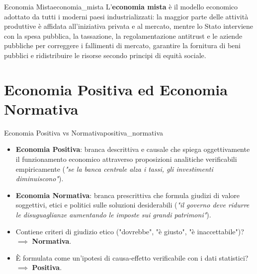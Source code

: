 \begin{definizione}{Economia Mista}{economia_mista}
L'\textbf{economia mista} è il modello economico adottato da tutti i moderni paesi industrializzati: la maggior parte delle attività produttive è affidata all'iniziativa privata e al mercato, mentre lo Stato interviene con la spesa pubblica, la tassazione, la regolamentazione antitrust e le aziende pubbliche per correggere i fallimenti di mercato, garantire la fornitura di beni pubblici e ridistribuire le risorse secondo principi di equità sociale.
\end{definizione}

\section{Economia Positiva ed Economia Normativa}

\begin{definizione}{Economia Positiva vs Normativa}{positiva_normativa}
\begin{itemize}
    \item \textbf{Economia Positiva}: branca descrittiva e causale che spiega oggettivamente il funzionamento economico attraverso proposizioni analitiche verificabili empiricamente (\textit{"se la banca centrale alza i tassi, gli investimenti diminuiscono"}).
    \item \textbf{Economia Normativa}: branca prescrittiva che formula giudizi di valore soggettivi, etici e politici sulle soluzioni desiderabili (\textit{"il governo deve ridurre le disuguaglianze aumentando le imposte sui grandi patrimoni"}).
\end{itemize}
\end{definizione}

\begin{esame}
\begin{itemize}
    \item Contiene criteri di giudizio etico ("dovrebbe", "è giusto", "è inaccettabile")? $\implies$ \textbf{Normativa}.
    \item È formulata come un'ipotesi di causa-effetto verificabile con i dati statistici? $\implies$ \textbf{Positiva}.
\end{itemize}
\end{esame}
